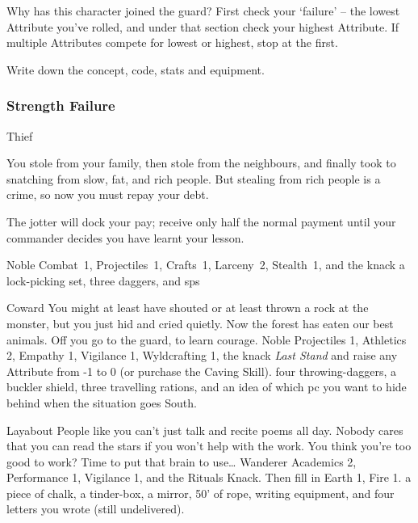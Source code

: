 \begin{multicols}{2}

\noindent
Why has this character joined the \gls{guard}?
First check your `failure' -- the lowest Attribute you've rolled, and under that section check your highest Attribute.
If multiple Attributes compete for lowest or highest, stop at the first.

Write down the concept, code, stats and equipment.

\subsubsection{Strength Failure}

\begin{itemize}

    {Thief}%
    {
      You stole from your family, then stole from the neighbours, and finally took to snatching from slow, fat, and rich people.
      But stealing from rich people is a crime, so now you must repay your debt.

      The \gls{jotter} will dock your pay; receive only half the normal payment until your commander decides you have learnt your lesson.

    }%
    {Noble}%
    {Combat~1, Projectiles~1, Crafts~1, Larceny~2, Stealth~1, and the knack }%
    {a lock-picking set, three daggers, and  \glspl{sp}}%

    {Coward}%
    {
      You might at least have shouted or at least thrown a rock at the monster, but you just hid and cried quietly.
      Now the forest has eaten our best animals.
      Off you go to the \gls{guard}, to learn courage.
    }%
    {Noble}%
    {
      Projectiles 1, Athletics 2, Empathy 1, Vigilance 1, Wyldcrafting 1, the knack \textit{Last Stand} and raise any Attribute from -1 to 0 (or purchase the Caving Skill).
    }%
    {
      four throwing-daggers, a buckler shield, three travelling rations, and an idea of which \gls{pc} you want to hide behind when the situation goes South.
    }%


    {Layabout}%
    {
      People like you can't just talk and recite poems all day.
      Nobody cares that you can read the stars if you won't help with the work.
      You think you're too good to work?
      Time to put that brain to use\ldots
    }%
    {Wanderer}%
    {%
      Academics 2, Performance 1, Vigilance 1, and the Rituals Knack.
    Then fill in Earth 1, Fire 1.
    }%
    {
      a piece of chalk, a tinder-box, a mirror, 50' of rope, writing equipment, and four letters you wrote (still undelivered).
    }%


\end{itemize}
\end{multicols}
